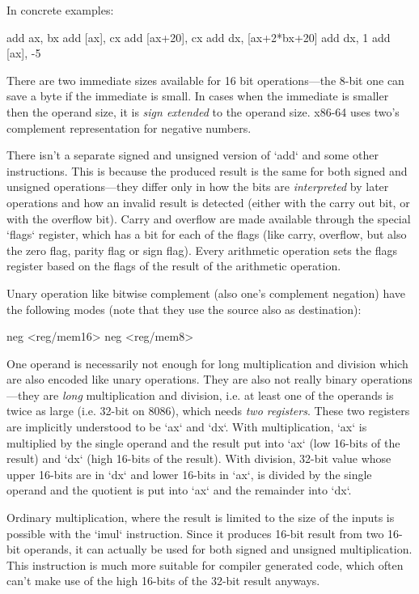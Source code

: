 In concrete examples:

\begtt
add ax, bx
add [ax], cx
add [ax+20], cx
add dx, [ax+2*bx+20]
add dx, 1
add [ax], -5
\endtt

There are two immediate sizes available for 16 bit operations---the 8-bit one
can save a byte if the immediate is small. In cases when the
immediate is smaller then the operand size, it is {\em sign extended} to the
operand size. x86-64 uses two's complement representation for negative numbers.

There isn't a separate signed and unsigned version of `add` and some other
instructions. This is because the produced result is the same for both signed and
unsigned operations---they differ only in how the bits are {\em interpreted} by
later operations and how an invalid result is detected (either with
the carry out bit, or with the overflow bit). Carry and overflow are made
available through the special `flags` register, which has a bit for each of the
flags (like carry, overflow, but also the zero flag, parity flag or
sign flag). Every arithmetic operation sets the flags register based on the
flags of the result of the arithmetic operation.

Unary operation like bitwise complement (also one's complement negation) have
the following modes (note that they use the source also as destination):

\begtt \optparams
neg <reg/mem16>
neg <reg/mem8>
\endtt

One operand is necessarily not enough for long multiplication and division which
are also encoded like unary operations. They are also not really binary
operations---they are {\em long} multiplication and division, i.e. at least one of the
operands is twice as large (i.e. 32-bit on 8086), which needs {\em two
registers}. These two registers are implicitly understood to be `ax` and `dx`.
With multiplication, `ax` is multiplied by the single operand and the result put
into `ax` (low 16-bits of the result) and `dx` (high 16-bits of the result).
With division, 32-bit value whose upper 16-bits are in `dx` and lower 16-bits in
`ax`, is divided by the single operand and the quotient is put into `ax` and the
remainder into `dx`.

Ordinary multiplication, where the result is limited to the size of the inputs
is possible with the `imul` instruction. Since it produces 16-bit result from
two 16-bit operands, it can actually be used for both signed and unsigned
multiplication. This instruction is much more suitable for compiler generated
code, which often can't make use of the high 16-bits of the 32-bit result
anyways.

